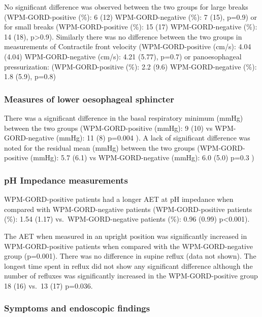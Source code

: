 \documentclass[english,man,floatsintext]{apa6}
\begin{document}
No significant difference was observed between the two groups for large breaks (WPM-GORD-positive (\%): 6 (12) WPM-GORD-negative (\%): 7 (15), p=0.9) or for small breaks (WPM-GORD-positive (\%): 15 (17) WPM-GORD-negative (\%): 14 (18), p\textgreater{}0.9). Similarly there was no difference between the two groups in measurements of Contractile front velocity (WPM-GORD-positive (cm/s): 4.04 (4.04) WPM-GORD-negative (cm/s): 4.21 (5.77), p=0.7) or panoesophageal pressurization: (WPM-GORD-positive (\%): 2.2 (9.6) WPM-GORD-negative (\%): 1.8 (5.9), p=0.8)

\hypertarget{measures-of-lower-oesophageal-sphincter}{%
\subsubsection{Measures of lower oesophageal sphincter}\label{measures-of-lower-oesophageal-sphincter}}

There was a significant difference in the basal respiratory minimum (mmHg) between the two groups (WPM-GORD-positive (mmHg): 9 (10) vs WPM-GORD-negative (mmHg): 11 (8) p=0.004 ). A lack of significant difference was noted for the residual mean (mmHg) between the two groups (WPM-GORD-positive (mmHg): 5.7 (6.1) vs WPM-GORD-negative (mmHg): 6.0 (5.0) p=0.3 )

\hypertarget{ph-impedance-measurements}{%
\subsubsection{pH Impedance measurements}\label{ph-impedance-measurements}}

WPM-GORD-positive patients had a longer AET at pH impedance when compared with WPM-GORD-negative patients (WPM-GORD-positive patients (\%): 1.54 (1.17) vs.~WPM-GORD-negative patients (\%): 0.96 (0.99) p\textless{}0.001).

The AET when measured in an upright position was significantly increased in WPM-GORD-positive patients when compared with the WPM-GORD-negative group (p=0.001). There was no difference in supine reflux (data not shown). The longest time spent in reflux did not show any significant difference although the number of refluxes was significantly increased in the WPM-GORD-positive group 18 (16) vs.~13 (17) p=0.036.

\hypertarget{symptoms-and-endoscopic-findings}{%
\subsubsection{Symptoms and endoscopic findings}\label{symptoms-and-endoscopic-findings}}
\end{document}
